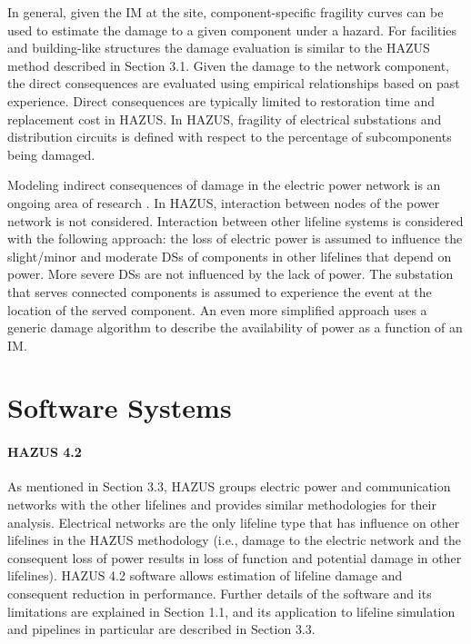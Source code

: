 In general, given the IM at the site, component-specific fragility curves can be used to estimate the damage to a given component under a hazard. For facilities and building-like structures the damage evaluation is similar to the HAZUS method described in Section 3.1. Given the damage to the network component, the direct consequences are evaluated using empirical relationships based on past experience. Direct consequences are typically limited to restoration time and replacement cost in HAZUS. In HAZUS, fragility of electrical substations and distribution circuits is defined with respect to the percentage of subcomponents being damaged.

Modeling indirect consequences of damage in the electric power network is an ongoing area of research \citep{moore2005using}. In HAZUS, interaction between nodes of the power network is not considered. Interaction between other lifeline systems is considered with the following approach: the loss of electric power is assumed to influence the slight/minor and moderate DSs of components in other lifelines that depend on power. More severe DSs are not influenced by the lack of power. The substation that serves connected components is assumed to experience the event at the location of the served component. An even more simplified approach uses a generic damage algorithm to describe the availability of power as a function of an IM. 

\section{Software Systems}
\label{sec:perf_power_tools}

\paragraph{HAZUS 4.2} As mentioned in Section 3.3, HAZUS groups electric power and communication networks with the other lifelines and provides similar methodologies for their analysis. Electrical networks are the only lifeline type that has influence on other lifelines in the HAZUS methodology (i.e., damage to the electric network and the consequent loss of power results in loss of function and potential damage in other lifelines). HAZUS 4.2 software allows estimation of lifeline damage and consequent reduction in performance. Further details of the software and its limitations are explained in Section 1.1, and its application to lifeline simulation and pipelines in particular are described in Section 3.3.

